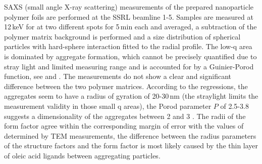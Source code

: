 SAXS (small angle X-ray scattering) measurements of the prepared nanoparticle polymer foils are performed at the SSRL beamline 1-5. Samples are measured at 12\,keV for at two different spots for 5\,min each and averaged, a subtraction of the polymer matrix background is performed and a size distribution of spherical particles with hard-sphere interaction fitted to the radial profile. The low-q area is dominated by aggregate formation, which cannot be precisely quantified due to stray light and limited measuring range and is accounted for by a Guinier-Porod function, see   and   \cite{percus1958,feigin1987,Ilavsky2009}.
The measurements do not show a clear and significant difference between the two polymer matrices. According to the regressions, the aggregates seem to have a radius of gyration of 20-30\,nm (the straylight limits the measurement validity in those small q areas), the Porod parameter $P$ of 2.5-3.8 suggests a dimensionality of the aggregates between 2 and 3 \cite{feigin1987,lili2005}. The radii of the form factor agree within the corresponding margin of error with the values of determined by TEM measurements, the difference between the radius parameters of the structure factors and the form factor is most likely caused by the thin layer of oleic acid ligands between aggregating particles.


